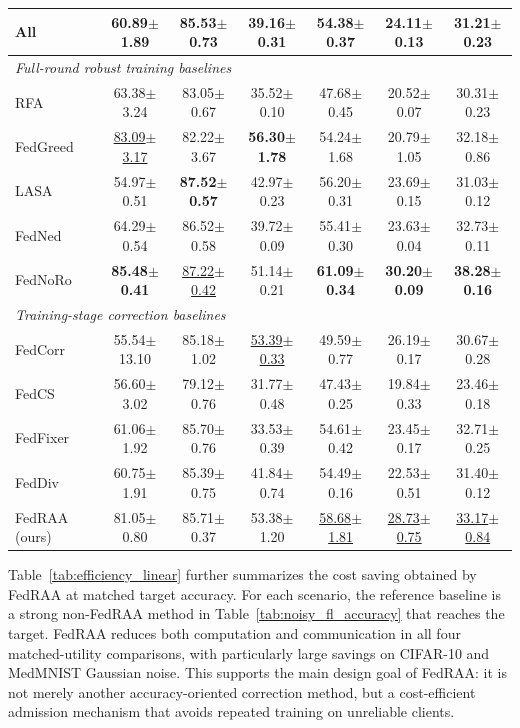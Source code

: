 \documentclass[conference]{IEEEtran}
\theoremstyle{definition}
\theoremstyle{remark}
\begin{document}
\begin{table}[t]
\begin{tabular}{lcccccc}
All & 60.89$\pm$1.89 & 85.53$\pm$0.73 & 39.16$\pm$0.31 & 54.38$\pm$0.37 & 24.11$\pm$0.13 & 31.21$\pm$0.23 \\
\midrule
\multicolumn{7}{l}{\textit{Full-round robust training baselines}} \\
RFA~\cite{pillutla2022robust} & 63.38$\pm$3.24 & 83.05$\pm$0.67 & 35.52$\pm$0.10 & 47.68$\pm$0.45 & 20.52$\pm$0.07 & 30.31$\pm$0.23 \\
FedGreed~\cite{kritharakis2025fedgreed} & \underline{83.09$\pm$3.17} & 82.22$\pm$3.67 & \textbf{56.30$\pm$1.78} & 54.24$\pm$1.68 & 20.79$\pm$1.05 & 32.18$\pm$0.86 \\
LASA~\cite{xu2025lasa} & 54.97$\pm$0.51 & \textbf{87.52$\pm$0.57} & 42.97$\pm$0.23 & 56.20$\pm$0.31 & 23.69$\pm$0.15 & 31.03$\pm$0.12 \\
FedNed~\cite{lu2024fedned} & 64.29$\pm$0.54 & 86.52$\pm$0.58 & 39.72$\pm$0.09 & 55.41$\pm$0.30 & 23.63$\pm$0.04 & 32.73$\pm$0.11 \\
FedNoRo~\cite{wu2023fednoro} & \textbf{85.48$\pm$0.41} & \underline{87.22$\pm$0.42} & 51.14$\pm$0.21 & \textbf{61.09$\pm$0.34} & \textbf{30.20$\pm$0.09} & \textbf{38.28$\pm$0.16} \\
\midrule
\multicolumn{7}{l}{\textit{Training-stage correction baselines}} \\
FedCorr~\cite{xu2022fedcorr} & 55.54$\pm$13.10 & 85.18$\pm$1.02 & \underline{53.39$\pm$0.33} & 49.59$\pm$0.77 & 26.19$\pm$0.17 & 30.67$\pm$0.28 \\
FedCS~\cite{hao2025fedcs} & 56.60$\pm$3.02 & 79.12$\pm$0.76 & 31.77$\pm$0.48 & 47.43$\pm$0.25 & 19.84$\pm$0.33 & 23.46$\pm$0.18 \\
FedFixer~\cite{ji2024fedfixer} & 61.06$\pm$1.92 & 85.70$\pm$0.76 & 33.53$\pm$0.39 & 54.61$\pm$0.42 & 23.45$\pm$0.17 & 32.71$\pm$0.25 \\
FedDiv~\cite{li2024feddiv} & 60.75$\pm$1.91 & 85.39$\pm$0.75 & 41.84$\pm$0.74 & 54.49$\pm$0.16 & 22.53$\pm$0.51 & 31.40$\pm$0.12 \\
\midrule
FedRAA (ours) & 81.05$\pm$0.80 & 85.71$\pm$0.37 & 53.38$\pm$1.20 & \underline{58.68$\pm$1.81} & \underline{28.73$\pm$0.75} & \underline{33.17$\pm$0.84} \\
\bottomrule
\end{tabular}
\end{table}

Table~\ref{tab:efficiency_linear} further summarizes the cost saving obtained by FedRAA at matched target accuracy.
For each scenario, the reference baseline is a strong non-FedRAA method in Table~\ref{tab:noisy_fl_accuracy} that reaches the target.
FedRAA reduces both computation and communication in all four matched-utility comparisons, with particularly large savings on CIFAR-10 and MedMNIST Gaussian noise.
This supports the main design goal of FedRAA: it is not merely another accuracy-oriented correction method, but a cost-efficient admission mechanism that avoids repeated training on unreliable clients.
\end{document}

